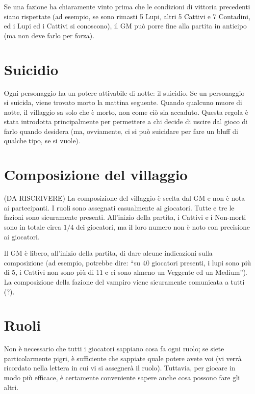 \documentclass[a4paper,10pt]{article}
\begin{document}
Se una fazione ha chiaramente vinto prima che le condizioni di vittoria precedenti siano rispettate (ad esempio, se sono rimasti 5 Lupi, altri 5 Cattivi e 7 Contadini, ed i Lupi ed i Cattivi si conoscono), il GM può porre fine alla partita in anticipo (ma non deve farlo per forza).




\section{Suicidio}

Ogni personaggio ha un potere attivabile di notte: il suicidio.
Se un personaggio si suicida, viene trovato morto la mattina seguente. Quando qualcuno muore di notte, il villaggio sa solo che è morto, non come ciò sia accaduto.
Questa regola è stata introdotta principalmente per permettere a chi decide di uscire dal gioco di farlo quando desidera (ma, ovviamente, ci si può suicidare per fare un bluff di qualche tipo, se si vuole).


\section{Composizione del villaggio}

(DA RISCRIVERE)
La composizione del villaggio è scelta dal GM e non è nota ai partecipanti. I ruoli sono assegnati casualmente ai giocatori.
Tutte e tre le fazioni sono sicuramente presenti. All'inizio della partita, i Cattivi e i Non-morti sono in totale circa $1/4$ dei giocatori, ma il loro numero non è noto con precisione ai giocatori.

Il GM è libero, all'inizio della partita, di dare alcune indicazioni sulla composizione (ad esempio, potrebbe dire: ``su $40$ giocatori presenti, i lupi sono più di $5$, i Cattivi non sono più di $11$ e ci sono almeno un Veggente ed un Medium''). La composizione della fazione del vampiro viene sicuramente comunicata a tutti (?).


\section{Ruoli}

Non è necessario che tutti i giocatori sappiano cosa fa ogni ruolo; se siete particolarmente pigri, è sufficiente che sappiate quale potere avete voi (vi verrà ricordato nella lettera in cui vi si assegnerà il ruolo). Tuttavia, per giocare in modo più efficace, è certamente conveniente sapere anche cosa possono fare gli altri.
\end{document}

